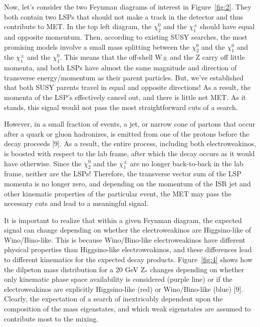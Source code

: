 \documentclass{article}
\begin{document}
\par
Now, let's consider the two Feynman diagrams of interest in Figure~\ref{fig:2}. They both contain two LSPs that should not make a track in the detector and thus contribute to MET. In the top left diagram, the $\chi^{0}_{2}$ and the $\chi^{\pm}_{1}$ should have equal and opposite momentum. Then, according to existing SUSY searches, the most promising models involve a small mass splitting between the $\chi^{0}_{2}$ and the $\chi^{0}_{1}$ and the $\chi^{\pm}_{1}$ and the $\chi^{0}_{1}$. This means that the off-shell W$\pm$ and the Z carry off little momenta, and both LSPs have almost the same magnitude and direction of transverse energy/momentum as their parent particles. But, we've established that both SUSY parents travel in equal and opposite directions! As a result, the momenta of the LSP's effectively cancel out, and there is little net MET. As it stands, this signal would not pass the most straightforward cuts of a search.
\par
However, in a small fraction of events, a jet, or narrow cone of partons that occur after a quark or gluon hadronizes, is emitted from one of the protons before the decay proceeds [9]. As a result, the entire process, including both electroweakinos, is boosted with respect to the lab frame, after which the decay occurs as it would have otherwise. Since the $\chi^{0}_{2}$ and the $\chi^{\pm}_{1}$ are no longer back-to-back in the lab frame, neither are the LSPs! Therefore, the transverse vector sum of the LSP momenta is no longer zero, and depending on the momentum of the ISR jet and other kinematic properties of the particular event, the MET may pass the necessary cuts and lead to a meaningful signal.
\par
It is important to realize that within a given Feynman diagram, the expected signal can change depending on whether the electroweakinos are Higgsino-like of Wino/Bino-like. This is because Wino/Bino-like electroweakinos have different physical properties than Higgsino-like electroweakinos, and these differences lead to different kinematics for the expected decay products. Figure~\ref{fig:4} shows how the dilpeton mass distribution for a 20 GeV Z$_{*}$ changes depending on whether only kinematic phase space availability is considered (purple line) or if the electroweakinos are explicitly Higgsino-like (red) or Wino/Bino-like (blue) [9]. Clearly, the expectation of a search of inextricably dependent upon the composition of the mass eigenstates, and which weak eigenstates are assumed to contribute most to the mixing.
\end{document}
